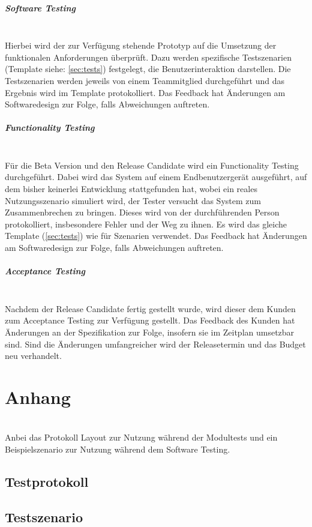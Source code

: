 \documentclass[10pt,a4paper]{article}
\begin{document}
\subparagraph{Software Testing}\ \\
Hierbei wird der zur Verfügung stehende Prototyp auf die Umsetzung der funktionalen Anforderungen überprüft. Dazu werden spezifische Testszenarien (Template siehe: \autoref{sec:tests}) festgelegt, die Benutzerinteraktion darstellen. Die Testszenarien werden jeweils von einem Teammitglied durchgeführt und das Ergebnis wird im Template protokolliert. Das Feedback hat Änderungen am Softwaredesign zur Folge, falls Abweichungen auftreten.

\subparagraph{Functionality Testing}\ \\
Für die Beta Version und den Release Candidate wird ein Functionality Testing durchgeführt. Dabei wird das System auf einem Endbenutzergerät ausgeführt, auf dem bisher keinerlei Entwicklung stattgefunden hat, wobei ein reales Nutzungsszenario simuliert wird, der Tester versucht das System zum Zusammenbrechen zu bringen. Dieses wird von der durchführenden Person protokolliert, insbesondere Fehler und der Weg zu ihnen. Es wird das gleiche Template (\autoref{sec:tests}) wie für Szenarien verwendet. Das Feedback hat Änderungen am Softwaredesign zur Folge, falls Abweichungen auftreten.

\subparagraph{Acceptance Testing}\ \\
Nachdem der Release Candidate fertig gestellt wurde, wird dieser dem Kunden zum Acceptance Testing zur Verfügung gestellt. Das Feedback des Kunden hat Änderungen an der Spezifikation zur Folge, insofern sie im Zeitplan umsetzbar sind. Sind die Änderungen umfangreicher wird der Releasetermin und das Budget neu verhandelt.

\section{Anhang} \ \\

Anbei das Protokoll Layout zur Nutzung während der Modultests und ein Beispielszenario zur Nutzung während dem Software Testing.\\
\newpage
\subsection{Testprotokoll}
\label{sec:testp}

\newpage
\subsection{Testszenario}
\label{sec:tests}

\end{document}
